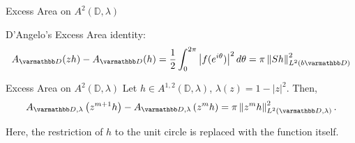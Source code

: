 \documentclass{reu_beamer}
\begin{document}
\begin{frame}{Excess Area on $A^2(\mathbb{D},\lambda)$}
    \begin{center}
        \small
        D'Angelo's Excess Area identity: 
        \[A_{\mathbb{D}}(zh) - A_{\mathbb{D}}(h) = \frac{1}{2}\int_0^{2\pi}\left|f(e^{i\theta})\right|^2d\theta = \pi \norm{Sh}_{L^{2}(b\mathbb{D})}^2\]
    \end{center}
\begin{block}{Excess Area on $A^{2}(\mathbb{D},\lambda)$}
    Let $h\in A^{1,2}(\mathbb{D},\lambda)$, $\lambda(z) = 1-|z|^2$. Then,
    \[ A_{\disc, \lambda}\left(z^{m+1}h\right)-A_{\disc, \lambda}\left(z^{m}h\right)=\pi\norm{z^mh}^2_{L^2(\mathbb{D},\lambda)}.\]
\end{block}
    Here, the restriction of $h$ to the unit circle is replaced with the function itself.
\end{frame}
%        
\end{document}
